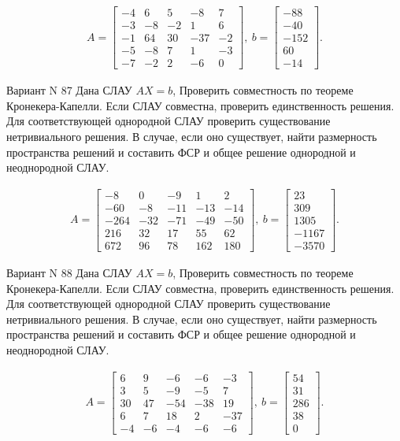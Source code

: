 \documentclass[11pt]{report}
\begin{document}
\begin{align*}
 A = \left[\begin{matrix}-4 & 6 & 5 & -8 & 7\\-3 & -8 & -2 & 1 & 6\\-1 & 64 & 30 & -37 & -2\\-5 & -8 & 7 & 1 & -3\\-7 & -2 & 2 & -6 & 0\end{matrix}\right],
\ b = \left[\begin{matrix}-88\\-40\\-152\\60\\-14\end{matrix}\right]. 
 \end{align*}

Вариант N 87
Дана СЛАУ $AX = b$,
Проверить совместность по теореме Кронекера-Капелли. Если СЛАУ совместна, проверить единственность решения.
Для соответствующей однородной СЛАУ проверить существование нетривиального решения. В случае, если оно существует,
найти размерность пространства решений и составить ФСР и общее решение однородной  и неоднородной СЛАУ.


\begin{align*}
 A = \left[\begin{matrix}-8 & 0 & -9 & 1 & 2\\-60 & -8 & -11 & -13 & -14\\-264 & -32 & -71 & -49 & -50\\216 & 32 & 17 & 55 & 62\\672 & 96 & 78 & 162 & 180\end{matrix}\right],
\ b = \left[\begin{matrix}23\\309\\1305\\-1167\\-3570\end{matrix}\right]. 
 \end{align*}

Вариант N 88
Дана СЛАУ $AX = b$,
Проверить совместность по теореме Кронекера-Капелли. Если СЛАУ совместна, проверить единственность решения.
Для соответствующей однородной СЛАУ проверить существование нетривиального решения. В случае, если оно существует,
найти размерность пространства решений и составить ФСР и общее решение однородной  и неоднородной СЛАУ.


\begin{align*}
 A = \left[\begin{matrix}6 & 9 & -6 & -6 & -3\\3 & 5 & -9 & -5 & 7\\30 & 47 & -54 & -38 & 19\\6 & 7 & 18 & 2 & -37\\-4 & -6 & -4 & -6 & -6\end{matrix}\right],
\ b = \left[\begin{matrix}54\\31\\286\\38\\0\end{matrix}\right]. 
 \end{align*}
\end{document}
